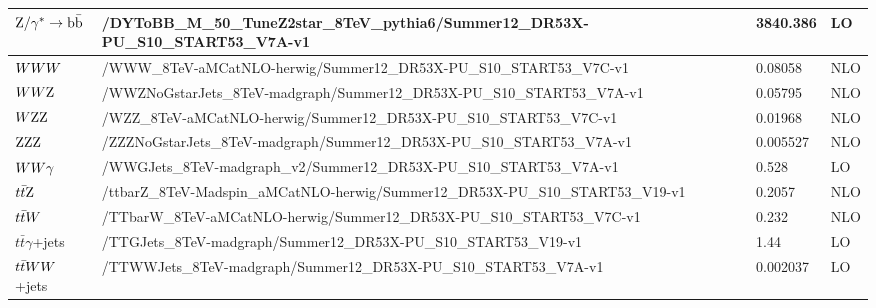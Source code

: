 \begin{table}
\begin{center}
\begin{tabular}{l l l l}
$\mathrm{Z}/\gamma^* \rightarrow \mathrm{b}\bar{\mathrm{b}}$ & 
/DYToBB\_M\_50\_TuneZ2star\_8TeV\_pythia6/Summer12\_DR53X-PU\_S10\_START53\_V7A-v1 & 3840.386 & LO \\
\midrule
$WWW$ & /WWW\_8TeV-aMCatNLO-herwig/Summer12\_DR53X-PU\_S10\_START53\_V7C-v1 & 0.08058 & NLO \\
$WW\mathrm{Z}$ & /WWZNoGstarJets\_8TeV-madgraph/Summer12\_DR53X-PU\_S10\_START53\_V7A-v1 & 0.05795 & NLO \\
$W\mathrm{Z}\mathrm{Z}$ & /WZZ\_8TeV-aMCatNLO-herwig/Summer12\_DR53X-PU\_S10\_START53\_V7C-v1 & 0.01968 & NLO \\
$\mathrm{Z}\mathrm{Z}\mathrm{Z}$ & /ZZZNoGstarJets\_8TeV-madgraph/Summer12\_DR53X-PU\_S10\_START53\_V7A-v1 & 0.005527 & NLO \\
$WW\gamma$ & /WWGJets\_8TeV-madgraph\_v2/Summer12\_DR53X-PU\_S10\_START53\_V7A-v1 & 0.528 & LO \\
\midrule
$t\bar{t}\mathrm{Z}$ & /ttbarZ\_8TeV-Madspin\_aMCatNLO-herwig/Summer12\_DR53X-PU\_S10\_START53\_V19-v1 
& 0.2057 & NLO \\
$t\bar{t}W$ & /TTbarW\_8TeV-aMCatNLO-herwig/Summer12\_DR53X-PU\_S10\_START53\_V7C-v1 & 0.232 & NLO \\
$t\bar{t}\gamma$+jets & /TTGJets\_8TeV-madgraph/Summer12\_DR53X-PU\_S10\_START53\_V19-v1 & 1.44 & LO \\
$t\bar{t}WW$+jets & /TTWWJets\_8TeV-madgraph/Summer12\_DR53X-PU\_S10\_START53\_V7A-v1 & 0.002037 & LO \\
\bottomrule
\end{tabular}
\end{center}
\label{tab:boost_mc_bg}
\end{table}


